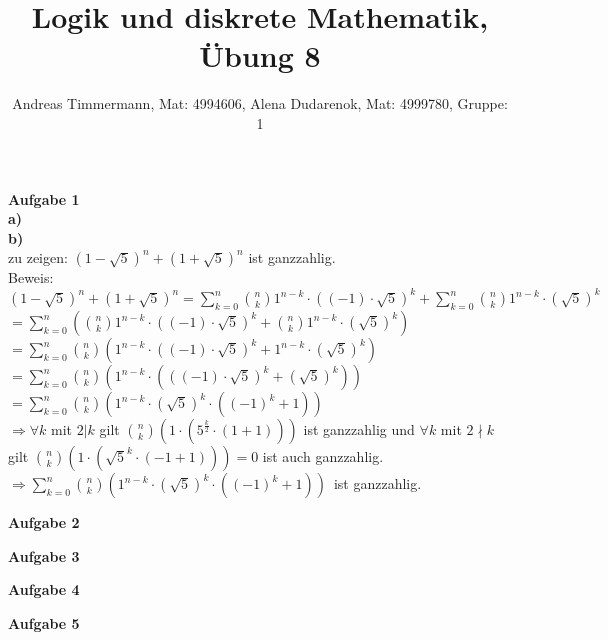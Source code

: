 \documentclass[a4paper]{scrartcl}
\title{Logik und diskrete Mathematik, Übung 8}
\author{Andreas Timmermann, Mat: 4994606, Alena Dudarenok, Mat: 4999780, Gruppe: 1}
\begin{document}
	\maketitle
	\begin{flushleft}
		\textbf{Aufgabe 1}\\
		\textbf{a)}\\
		
		\textbf{b)}\\
		zu zeigen: $(1-\sqrt{5})^n + (1+\sqrt{5})^n$ ist ganzzahlig.\\
		Beweis:\\
		$(1-\sqrt{5})^n + (1+\sqrt{5})^n = \sum\limits_{k=0}^{n}\binom{n}{k}1^{n-k}\cdot ((-1)\cdot \sqrt{5})^k + \sum\limits_{k=0}^{n}\binom{n}{k}1^{n-k}\cdot (\sqrt{5})^k$\\
		$= \sum\limits_{k=0}^{n}(\binom{n}{k}1^{n-k}\cdot ((-1)\cdot \sqrt{5})^k + \binom{n}{k}1^{n-k}\cdot (\sqrt{5})^k)$\\
		$= \sum\limits_{k=0}^{n}\binom{n}{k}(1^{n-k}\cdot ((-1)\cdot \sqrt{5})^k + 1^{n-k}\cdot (\sqrt{5})^k)$\\
		$= \sum\limits_{k=0}^{n}\binom{n}{k}(1^{n-k}\cdot (((-1)\cdot \sqrt{5})^k + (\sqrt{5})^k))$\\
		$= \sum\limits_{k=0}^{n}\binom{n}{k}(1^{n-k}\cdot (\sqrt{5})^k \cdot((-1)^k  + 1))$\\
		$\Rightarrow \forall k $ mit $2|k$ gilt $\binom{n}{k}(1\cdot (5^{\frac{k}{2}} \cdot(1  + 1)))$ ist ganzzahlig und $\forall k $ mit $2\nmid k$ gilt $\binom{n}{k}(1\cdot (\sqrt{5}^k \cdot(-1  + 1))) = 0$ ist auch ganzzahlig.\\
		$\Rightarrow \sum\limits_{k=0}^{n}\binom{n}{k}(1^{n-k}\cdot (\sqrt{5})^k \cdot((-1)^k  + 1))$\ ist ganzzahlig.\\
	\end{flushleft}
	\begin{flushleft}
		\textbf{Aufgabe 2}\\
	\end{flushleft}
	\begin{flushleft}
		\textbf{Aufgabe 3}\\
	\end{flushleft}
	\begin{flushleft}
		\textbf{Aufgabe 4}\\
	\end{flushleft}
	\begin{flushleft}
		\textbf{Aufgabe 5}\\
	\end{flushleft}
\end{document}
